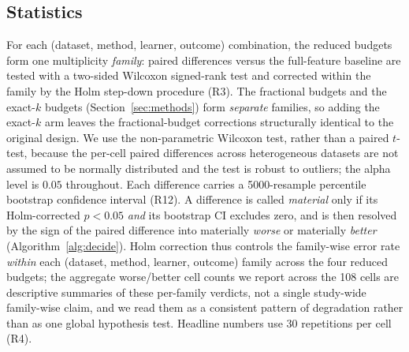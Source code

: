 \documentclass[fleqn,10pt]{wlscirep}
\newcommand{\result}[1]{#1}
\begin{document}
\subsection{Statistics}
For each (dataset, method, learner, outcome) combination, the reduced budgets form one
multiplicity \emph{family}: paired differences versus the full-feature baseline are tested with a
two-sided Wilcoxon signed-rank test and corrected within the family by the Holm step-down procedure
\cite{holm1979simple} (R3). The fractional budgets and the exact-$k$ budgets
(Section~\ref{sec:methods}) form \emph{separate} families, so adding the exact-$k$ arm leaves the
fractional-budget corrections structurally identical to the original design. We use the non-parametric Wilcoxon test, rather than a paired $t$-test,
because the per-cell paired differences across heterogeneous datasets are not assumed to be normally
distributed and the test is robust to outliers; the alpha level is $0.05$ throughout. Each
difference carries a 5000-resample percentile bootstrap confidence interval (R12). A difference
is called \emph{material} only if its Holm-corrected $p<0.05$ \emph{and} its bootstrap CI
excludes zero, and is then resolved by the sign of the paired difference into materially
\emph{worse} or materially \emph{better} (Algorithm~\ref{alg:decide}). Holm correction thus controls
the family-wise error rate \emph{within} each (dataset, method, learner, outcome) family across the
four reduced budgets; the aggregate worse/better cell counts we report across the 108 cells are
descriptive summaries of these per-family verdicts, not a single study-wide family-wise claim, and we
read them as a consistent pattern of degradation rather than as one global hypothesis test. Headline
numbers use \result{30} repetitions per cell (R4).
\end{document}
